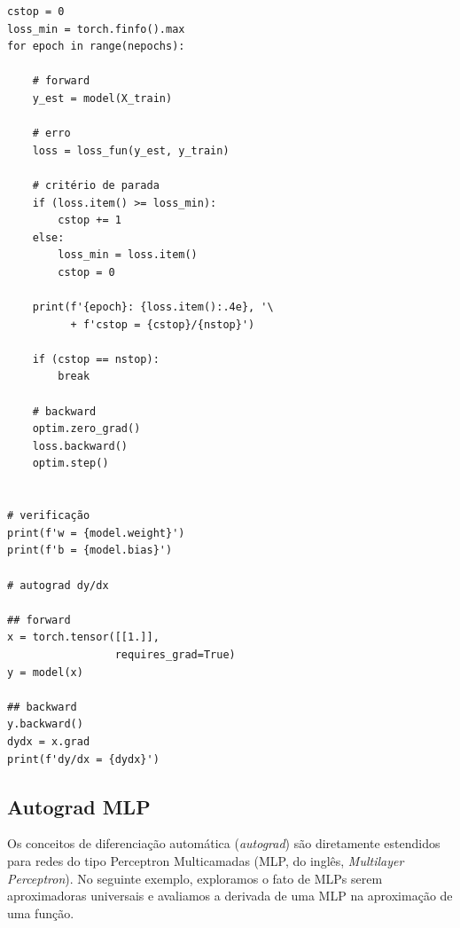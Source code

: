 \begin{ex}
\begin{lstlisting}[caption=autograd\_percep.py]
cstop = 0
loss_min = torch.finfo().max
for epoch in range(nepochs):

    # forward
    y_est = model(X_train)

    # erro
    loss = loss_fun(y_est, y_train)

    # critério de parada
    if (loss.item() >= loss_min):
        cstop += 1
    else:
        loss_min = loss.item()
        cstop = 0

    print(f'{epoch}: {loss.item():.4e}, '\
          + f'cstop = {cstop}/{nstop}')

    if (cstop == nstop):
        break

    # backward
    optim.zero_grad()
    loss.backward()
    optim.step()


# verificação
print(f'w = {model.weight}')
print(f'b = {model.bias}')

# autograd dy/dx

## forward
x = torch.tensor([[1.]],
                 requires_grad=True)
y = model(x)

## backward
y.backward()
dydx = x.grad
print(f'dy/dx = {dydx}')
\end{lstlisting}
\end{ex}

\subsection{Autograd MLP}

Os conceitos de diferenciação automática (\emph{autograd}) são diretamente estendidos para redes do tipo Perceptron Multicamadas (MLP, do inglês, \textit{Multilayer Perceptron}). No seguinte exemplo, exploramos o fato de MLPs serem aproximadoras universais e avaliamos a derivada de uma MLP na aproximação de uma função.

